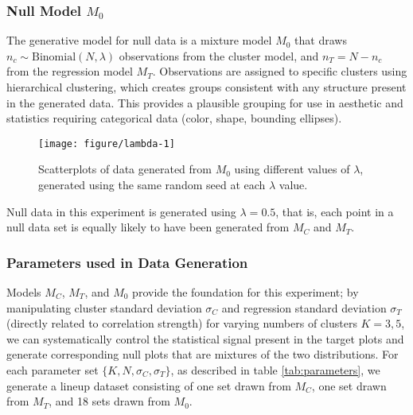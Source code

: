 \documentclass[12pt]{article}\usepackage[]{graphicx}\usepackage[]{color}
\newenvironment{knitrout}{}{} %
\begin{document}
\subsubsection{Null Model \texorpdfstring{$M_0$}{M0}}
The generative model for null data is a mixture model $M_0$ that draws $n_c \sim \text{Binomial}(N, \lambda)$ observations from the cluster model, and $n_T = N - n_c$ from the regression model $M_T$. Observations are assigned to specific clusters using hierarchical clustering, which creates groups consistent with any structure present in the generated data. This provides a plausible grouping for use in aesthetic and statistics requiring categorical data (color, shape, bounding ellipses). 

\begin{figure}[hbt]
\begin{knitrout}
\color{fgcolor}

{\centering \texttt{[image: figure/lambda-1]} 

}



\end{knitrout}
\caption[Mixing parameter for null model $M_0$]{\label{fig:lambda} Scatterplots of data generated from $M_0$ using different values of $\lambda$, generated using the same random seed at each $\lambda$ value.}
\end{figure}

Null data in this experiment is generated using $\lambda = 0.5$, that is, each point in a null data set is equally likely to have been generated from $M_C$ and $M_T$. 

\subsubsection{Parameters used in Data Generation}
Models $M_C$, $M_T$, and $M_0$ provide the foundation for this experiment; by manipulating cluster standard deviation $\sigma_C$ and regression standard deviation $\sigma_T$ (directly related to correlation strength) for varying numbers of clusters $K=3, 5$, we can systematically control the statistical signal present in the target plots and generate corresponding null plots that are mixtures of the two distributions. For each parameter set $\{K, N, \sigma_C, \sigma_T\}$, as described in table \ref{tab:parameters}, we  generate a lineup dataset consisting of one set drawn from $M_C$, one set drawn from $M_T$, and 18 sets drawn from $M_0$. 
\end{document}
